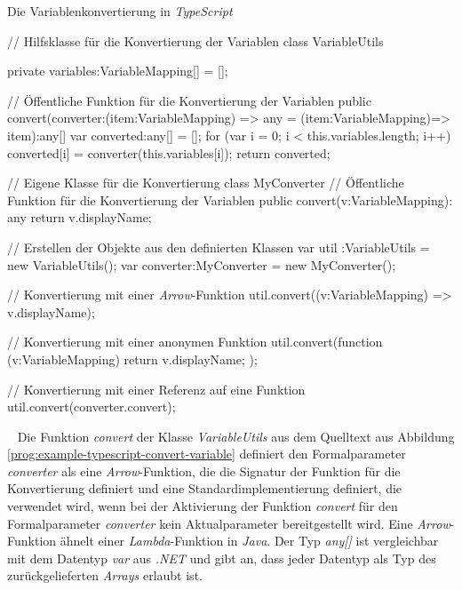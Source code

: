\begin{program}[h]
\caption{Die Variablenkonvertierung in \emph{TypeScript}}
\label{prog:example-typescript-convert-variable}
\begin{JsCode}
// Hilfsklasse für die Konvertierung der Variablen
class VariableUtils {
    private variables:VariableMapping[] = [];
	
    // Öffentliche Funktion für die Konvertierung der Variablen
    public convert(converter:(item:VariableMapping) => any 
    	                    = (item:VariableMapping)=> item):any[] {
        var converted:any[] = [];
        for (var i = 0; i < this.variables.length; i++) {
            converted[i] = converter(this.variables[i]);
        }
        return converted;	            
    }
}

// Eigene Klasse für die Konvertierung
class MyConverter {
    // Öffentliche Funktion für die Konvertierung der Variablen
    public convert(v:VariableMapping): any {
        return v.displayName;
    }
}

// Erstellen der Objekte aus den definierten Klassen
var util     :VariableUtils = new VariableUtils();
var converter:MyConverter   = new MyConverter();

// Konvertierung mit einer \emph{Arrow}-Funktion
util.convert((v:VariableMapping) => v.displayName);

// Konvertierung mit einer anonymen Funktion
util.convert(function (v:VariableMapping) {
    return v.displayName;
});

// Konvertierung mit einer Referenz auf eine Funktion
util.convert(converter.convert);
\end{JsCode} 
\end{program}
\ \newline
Die Funktion \emph{convert} der Klasse \emph{VariableUtils} aus dem Quelltext aus Abbildung \ref{prog:example-typescript-convert-variable} definiert den Formalparameter \emph{converter} als eine \emph{Arrow}-Funktion, die die Signatur der Funktion für die Konvertierung definiert und eine Standardimplementierung definiert, die verwendet wird, wenn bei der Aktivierung der Funktion \emph{convert} für den Formalparameter \emph{converter} kein Aktualparameter bereitgestellt wird.   Eine \emph{Arrow}-Funktion ähnelt einer \emph{Lambda}-Funktion in \emph{Java}. Der Typ \emph{any[]} ist vergleichbar mit dem Datentyp \emph{var} aus \emph{.NET} und gibt an, dass jeder Datentyp als Typ des zurückgelieferten \emph{Arrays} erlaubt ist.
\newpage


